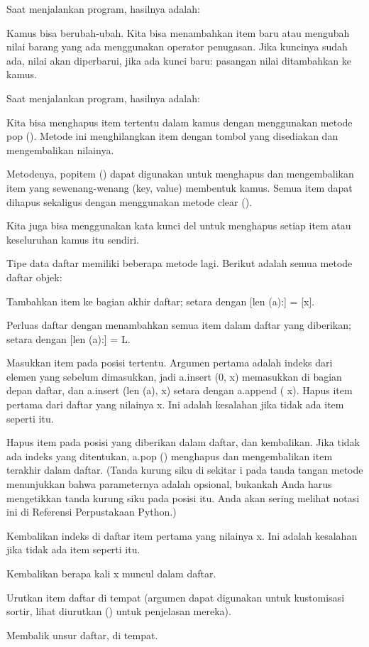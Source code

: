 Saat menjalankan program, hasilnya adalah: 

Kamus bisa berubah-ubah. Kita bisa menambahkan item baru atau mengubah nilai barang yang ada menggunakan operator penugasan. 
Jika kuncinya sudah ada, nilai akan diperbarui, jika ada kunci baru: pasangan nilai ditambahkan ke kamus. 

Saat menjalankan program, hasilnya adalah: 

Kita bisa menghapus item tertentu dalam kamus dengan menggunakan metode pop (). Metode ini menghilangkan item dengan tombol yang disediakan dan mengembalikan nilainya. \par

Metodenya, popitem () dapat digunakan untuk menghapus dan mengembalikan item yang sewenang-wenang (key, value) membentuk kamus. Semua item dapat dihapus sekaligus dengan menggunakan metode clear (). \par

Kita juga bisa menggunakan kata kunci del untuk menghapus setiap item atau keseluruhan kamus itu sendiri. 

Tipe data daftar memiliki beberapa metode lagi. Berikut adalah semua metode daftar objek: 

Tambahkan item ke bagian akhir daftar; setara dengan [len (a):] = [x]. 

Perluas daftar dengan menambahkan semua item dalam daftar yang diberikan; setara dengan [len (a):] = L. 
 
Masukkan item pada posisi tertentu. Argumen pertama adalah indeks dari elemen yang sebelum dimasukkan, jadi a.insert (0, x) memasukkan di bagian depan daftar, dan a.insert (len (a), x) setara dengan a.append ( x). 
Hapus item pertama dari daftar yang nilainya x. Ini adalah kesalahan jika tidak ada item seperti itu. 
 
Hapus item pada posisi yang diberikan dalam daftar, dan kembalikan. Jika tidak ada indeks yang ditentukan, a.pop () menghapus dan mengembalikan item terakhir dalam daftar. (Tanda kurung siku di sekitar i pada tanda tangan metode menunjukkan bahwa parameternya adalah opsional, bukankah Anda harus mengetikkan tanda kurung siku pada posisi itu. Anda akan sering melihat notasi ini di Referensi Perpustakaan Python.) \par

Kembalikan indeks di daftar item pertama yang nilainya x. Ini adalah kesalahan jika tidak ada item seperti itu. 
 
Kembalikan berapa kali x muncul dalam daftar.

Urutkan item daftar di tempat (argumen dapat digunakan untuk kustomisasi sortir, lihat diurutkan () untuk penjelasan mereka).

Membalik unsur daftar, di tempat. 

